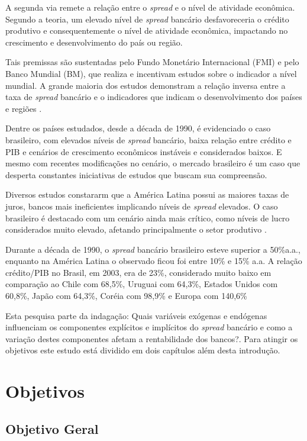 \documentclass[12pt,openright,oneside,a4paper,chapter=TITLE,section=TITLE,subsection=TITLE,english,french,spanish,portugues,sumario=tradicional]{04-class-files/abntex2}
\begin{document}
A segunda via remete a relação entre o \emph{spread} e o nível de atividade
econômica. Segundo a teoria, um elevado nível de \emph{spread} bancário
desfavoreceria o crédito produtivo e consequentemente o nível de atividade
econômica, impactando no crescimento e desenvolvimento do país ou região.

Tais premissas são sustentadas pelo Fundo Monetário Internacional (FMI) e pelo
Banco Mundial (BM), que realiza e incentivam estudos sobre o indicador a
nível mundial. A grande maioria dos estudos demonstram a relação inversa entre a taxa de \emph{spread} bancário e o indicadores que indicam o desenvolvimento dos
países e regiões \cite{WB:2005}.

Dentre os países estudados, desde a década de 1990, é evidenciado o caso brasileiro, com elevados níveis de \emph{spread} bancário, baixa relação entre crédito e PIB e cenários de crescimento econômicos instáveis e considerados baixos. E mesmo com recentes modificações no cenário, o mercado brasileiro é um caso que desperta constantes iniciativas de estudos que buscam sua compreensão.

Diversos estudos constararm que a América Latina possui as maiores taxas de
juros, bancos mais ineficientes implicando níveis de \emph{spread} elevados. O caso
brasileiro é destacado com um cenário ainda mais crítico, como níveis de lucro
considerados muito elevado, afetando principalmente o setor produtivo \cite{dantas:2012}.

Durante a década de 1990, o \emph{spread} bancário brasileiro esteve superior a
50\%a.a., enquanto na América Latina o observado ficou foi entre 10\% e 15\% a.a.
A relação crédito/PIB no Brasil, em 2003, era de 23\%, considerado muito baixo
em comparação ao Chile com 68,5\%, Uruguai com 64,3\%, Estados Unidos com 60,8\%,
Japão com 64,3\%, Coréia com 98,9\% e Europa com 140,6\% \cite{camargo:2009,leal:2006}

Esta pesquisa parte da indagação: Quais variáveis exógenas e endógenas
influenciam os componentes explícitos e implícitos do \emph{spread} bancário e como
a variação destes componentes afetam a rentabilidade dos bancos?. Para atingir
os objetivos este estudo está dividido em dois capítulos além desta introdução.

\section{Objetivos}

\subsection{Objetivo Geral}
\end{document}
